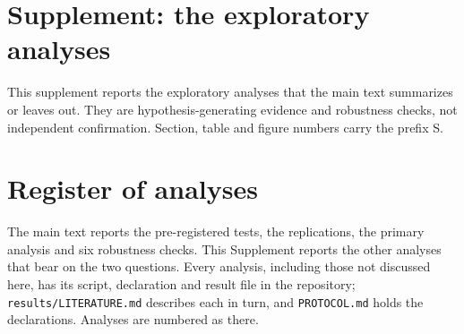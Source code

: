\documentclass[11pt]{article}
\begin{document}
\clearpage
{}\label{supplement}
\section*{Supplement: the exploratory analyses}

\noindent This supplement reports the exploratory analyses that the main text summarizes or leaves out. They are hypothesis-generating evidence and robustness checks, not independent confirmation. Section, table and figure numbers carry the prefix S.

\setcounter{section}{0}
\setcounter{table}{0}
\setcounter{figure}{0}
\renewcommand{\thesection}{S\arabic{section}}
\renewcommand{\thetable}{S\arabic{table}}
\renewcommand{\thefigure}{S\arabic{figure}}
\renewcommand{\theHsection}{S\arabic{section}}
\renewcommand{\theHtable}{S\arabic{table}}
\renewcommand{\theHfigure}{S\arabic{figure}}

\section{Register of analyses}\label{sec:register}

The main text reports the pre-registered tests, the replications, the primary analysis and six robustness checks. This Supplement reports the other analyses that bear on the two questions. Every analysis, including those not discussed here, has its script, declaration and result file in the repository; \texttt{results/LITERATURE.md} describes each in turn, and \texttt{PROTOCOL.md} holds the declarations. Analyses are numbered as there.
\end{document}

